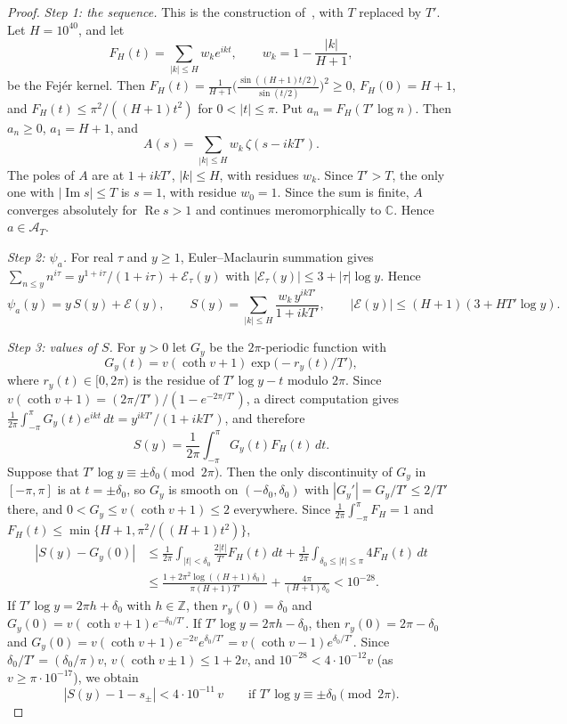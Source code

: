 \documentclass{amsart}
\theoremstyle{definition}
\theoremstyle{remark}
\theoremstyle{plain}
\numberwithin{equation}{section}
\newcommand{\cA}{\mathcal{A}}
\begin{document}
\begin{proof}
\emph{Step 1: the sequence.} This is the construction of~\cite[Prop.~3.1]{CH25}, with $T$ replaced by $T'$. Let $H=10^{40}$, and let
\[
F_H(t)=\sum_{|k|\le H}w_ke^{ikt},\qquad w_k=1-\frac{|k|}{H+1},
\]
be the Fej\'er kernel. Then $F_H(t)=\frac{1}{H+1}\bigl(\frac{\sin((H+1)t/2)}{\sin(t/2)}\bigr)^2\ge0$, $F_H(0)=H+1$, and $F_H(t)\le\pi^2/((H+1)t^2)$ for $0<|t|\le\pi$. Put $a_n=F_H(T'\log n)$. Then $a_n\ge0$, $a_1=H+1$, and
\[
A(s)=\sum_{|k|\le H}w_k\,\zeta(s-ikT').
\]
The poles of $A$ are at $1+ikT'$, $|k|\le H$, with residues $w_k$. Since $T'>T$, the only one with $|\operatorname{Im}s|\le T$ is $s=1$, with residue $w_0=1$. Since the sum is finite, $A$ converges absolutely for $\operatorname{Re}s>1$ and continues meromorphically to $\mathbb C$. Hence $a\in\cA_T$.

\emph{Step 2: $\psi_a$.} For real $\tau$ and $y\ge1$, Euler--Maclaurin summation gives $\sum_{n\le y}n^{i\tau}=y^{1+i\tau}/(1+i\tau)+\mathcal E_\tau(y)$ with $|\mathcal E_\tau(y)|\le3+|\tau|\log y$. Hence
\[
\psi_a(y)=y\,S(y)+\mathcal E(y),\qquad S(y)=\sum_{|k|\le H}\frac{w_k\,y^{ikT'}}{1+ikT'},\qquad|\mathcal E(y)|\le(H+1)(3+HT'\log y).
\]

\emph{Step 3: values of $S$.} For $y>0$ let $G_y$ be the $2\pi$-periodic function with
\[
G_y(t)=v(\coth v+1)\exp\bigl(-r_y(t)/T'\bigr),
\]
where $r_y(t)\in[0,2\pi)$ is the residue of $T'\log y-t$ modulo $2\pi$. Since $v(\coth v+1)=(2\pi/T')/(1-e^{-2\pi/T'})$, a direct computation gives $\frac1{2\pi}\int_{-\pi}^{\pi}G_y(t)e^{ikt}\,dt=y^{ikT'}/(1+ikT')$, and therefore
\[
S(y)=\frac1{2\pi}\int_{-\pi}^{\pi}G_y(t)F_H(t)\,dt.
\]
Suppose that $T'\log y\equiv\pm\delta_0\pmod{2\pi}$. Then the only discontinuity of $G_y$ in $[-\pi,\pi]$ is at $t=\pm\delta_0$, so $G_y$ is smooth on $(-\delta_0,\delta_0)$ with $|G_y'|=G_y/T'\le2/T'$ there, and $0<G_y\le v(\coth v+1)\le2$ everywhere. Since $\frac1{2\pi}\int_{-\pi}^{\pi}F_H=1$ and $F_H(t)\le\min\{H+1,\pi^2/((H+1)t^2)\}$,
\begin{align*}
|S(y)-G_y(0)|&\le\frac1{2\pi}\int_{|t|<\delta_0}\frac{2|t|}{T'}F_H(t)\,dt+\frac1{2\pi}\int_{\delta_0\le|t|\le\pi}4F_H(t)\,dt\\
&\le\frac{1+2\pi^2\log((H+1)\delta_0)}{\pi(H+1)T'}+\frac{4\pi}{(H+1)\delta_0}<10^{-28}.
\end{align*}
If $T'\log y=2\pi h+\delta_0$ with $h\in\mathbb Z$, then $r_y(0)=\delta_0$ and $G_y(0)=v(\coth v+1)e^{-\delta_0/T'}$. If $T'\log y=2\pi h-\delta_0$, then $r_y(0)=2\pi-\delta_0$ and $G_y(0)=v(\coth v+1)e^{-2v}e^{\delta_0/T'}=v(\coth v-1)e^{\delta_0/T'}$. Since $\delta_0/T'=(\delta_0/\pi)v$, $v(\coth v\pm1)\le1+2v$, and $10^{-28}<4\cdot10^{-12}v$ (as $v\ge\pi\cdot10^{-17}$), we obtain
\begin{equation}\label{eq:Svals}
|S(y)-1-s_\pm|<4\cdot10^{-11}\,v\qquad\text{if }T'\log y\equiv\pm\delta_0\pmod{2\pi}.
\end{equation}


\end{proof}
\end{document}
